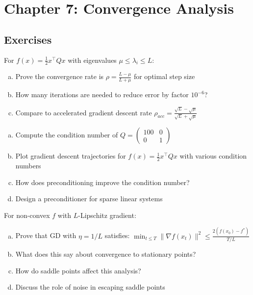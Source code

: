 \documentclass[../main.tex]{subfiles}
\begin{document}
\section{Chapter 7: Convergence Analysis}\label{sec:ex-convergence}

\subsection{Exercises}

\begin{simpleexercise}
For $f(x) = \frac{1}{2}x^\top Qx$ with eigenvalues $\mu \leq \lambda_i \leq L$:
\begin{enumerate}[(a)]
    \item Prove the convergence rate is $\rho = \frac{L - \mu}{L + \mu}$ for optimal step size
    \item How many iterations are needed to reduce error by factor $10^{-6}$?
    \item Compare to accelerated gradient descent rate $\rho_{acc} = \frac{\sqrt{L} - \sqrt{\mu}}{\sqrt{L} + \sqrt{\mu}}$
\end{enumerate}
\end{simpleexercise}

\begin{simpleexercise}
\begin{enumerate}[(a)]
    \item Compute the condition number of $Q = \begin{pmatrix} 100 & 0 \\ 0 & 1 \end{pmatrix}$
    \item Plot gradient descent trajectories for $f(x) = \frac{1}{2}x^\top Q x$ with various condition numbers
    \item How does preconditioning improve the condition number?
    \item Design a preconditioner for sparse linear systems
\end{enumerate}
\end{simpleexercise}

\begin{simpleexercise}
For non-convex $f$ with $L$-Lipschitz gradient:
\begin{enumerate}[(a)]
    \item Prove that GD with $\eta = 1/L$ satisfies: $\min_{t \leq T} \|\nabla f(x_t)\|^2 \leq \frac{2(f(x_0) - f^*)}{T/L}$
    \item What does this say about convergence to stationary points?
    \item How do saddle points affect this analysis?
    \item Discuss the role of noise in escaping saddle points
\end{enumerate}
\end{simpleexercise}
\end{document}
